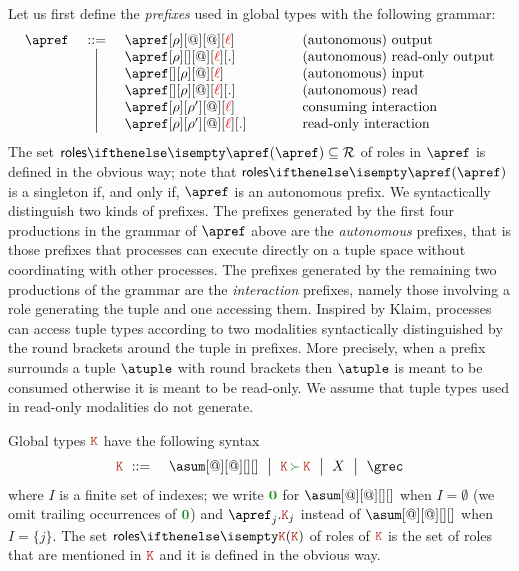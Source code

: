 %
Let us first define the \emph{prefixes} used in global types
with the following grammar:
%
\[\begin{array}{lcl@{\qquad\qquad}l}
  \apref & \bnfdef
  & \apref[\arole][@][@][\alocvar] & \text{(autonomous) output}
  \\ & \bnfmid
  & \apref[\arole][{}][@][\alocvar][.] & \text{(autonomous) read-only output}
  \\ & \bnfmid
  & \apref[{}][\arole][@][\alocvar] & \text{(autonomous) input}
  \\ & \bnfmid
  & \apref[{}][\arole][@][\alocvar][.] & \text{(autonomous) read}
  \\ & \bnfmid
  & \apref[\arole][\arole'][@][\alocvar] & \text{consuming interaction}
  \\ & \bnfmid
  & \apref[\arole][\arole'][@][\alocvar][.]  & \text{read-only interaction}
  \end{array}
\]
%
The set $\roles \apref \subseteq \roleset$ of roles in $\apref$ is
defined in the obvious way; note that $\roles \apref$ is a singleton
if, and only if, $\apref$ is an autonomous prefix.
%
We syntactically distinguish two kinds of prefixes.
%
The prefixes generated by the first four productions in the grammar of
$\apref$ above are the \emph{autonomous} prefixes, that is those
prefixes that processes can execute directly on a tuple space without
coordinating with other processes.
%
The prefixes generated by the remaining two productions of the grammar
are the \emph{interaction} prefixes, namely those involving a role
generating the tuple and one accessing them.
%
Inspired by Klaim, processes can access tuple types according to two
modalities syntactically distinguished by the round brackets around
the tuple in prefixes.
%
More precisely, when a prefix surrounds a tuple $\atuple$ with round
brackets then $\atuple$ is meant to be consumed otherwise it is meant
to be read-only.
%
%
We assume that tuple types used in read-only modalities do not
generate.
%

Global types $\aK$ have the following syntax
\begin{eqnarray*}
  \aK & \bnfdef & \asum[@][@][][]
                  \bnfmid
                  \aK \seqop \aK \bnfmid
                  X \bnfmid
                  \grec
\end{eqnarray*}
where $I$ is a finite set of indexes; we write $\nil$ for
$\asum[@][@][][]$ when $I = \emptyset$ (we omit trailing occurrences
of $\nil$) and $\apref_j.\aK_j$ instead of $\asum[@][@][][]$ when
$I = \{j\}$.
%
The set $\roles \aK$ of roles of $\aK$ is the set of roles that are mentioned in $\aK$ and it is defined in the obvious way.


